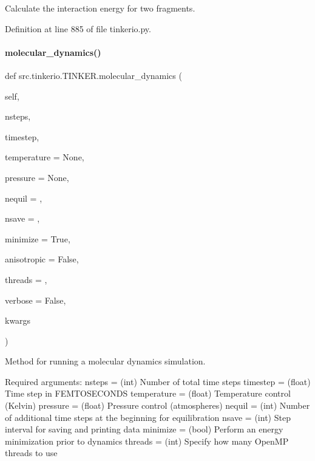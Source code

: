 Calculate the interaction energy for two fragments. 



Definition at line 885 of file tinkerio.\+py.

\mbox{\label{classsrc_1_1tinkerio_1_1TINKER_a337833adac99202891b64a14bf92a7c2}} 
\paragraph{\texorpdfstring{molecular\+\_\+dynamics()}{molecular\_dynamics()}}
{\footnotesize\ttfamily def src.\+tinkerio.\+T\+I\+N\+K\+E\+R.\+molecular\+\_\+dynamics (\begin{DoxyParamCaption}\item[{}]{self,  }\item[{}]{nsteps,  }\item[{}]{timestep,  }\item[{}]{temperature = {\ttfamily None},  }\item[{}]{pressure = {\ttfamily None},  }\item[{}]{nequil = {},  }\item[{}]{nsave = {},  }\item[{}]{minimize = {\ttfamily True},  }\item[{}]{anisotropic = {\ttfamily False},  }\item[{}]{threads = {},  }\item[{}]{verbose = {\ttfamily False},  }\item[{}]{kwargs }\end{DoxyParamCaption})}



Method for running a molecular dynamics simulation. 

Required arguments\+: nsteps = (int) Number of total time steps timestep = (float) Time step in F\+E\+M\+T\+O\+S\+E\+C\+O\+N\+DS temperature = (float) Temperature control (Kelvin) pressure = (float) Pressure control (atmospheres) nequil = (int) Number of additional time steps at the beginning for equilibration nsave = (int) Step interval for saving and printing data minimize = (bool) Perform an energy minimization prior to dynamics threads = (int) Specify how many Open\+MP threads to use

